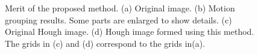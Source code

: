 \begin{figure}
\centering
{}
\caption[Merit of the proposed method]{Merit of the proposed method. (a) Original image. (b) Motion grouping results. Some parts are enlarged to show details. (c) Original Hough image. (d) Hough image formed using this method. The grids in (c) and (d) correspond to the grids in(a).}
\label{fig:compa}
\end{figure}



